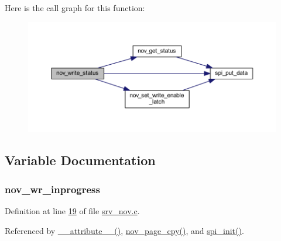 Here is the call graph for this function\+:
\nopagebreak
\begin{figure}[H]
\begin{center}
\leavevmode
\includegraphics[width=350pt]{d5/d16/a00029_a495e93d64734be469f6725de24dd44e1_cgraph}
\end{center}
\end{figure}




\subsection{Variable Documentation}
\hypertarget{a00029_a56fe014653ebdce270aeac664bf86e65}{
\subsubsection[{nov\+\_\+wr\+\_\+inprogress}]{ nov\+\_\+wr\+\_\+inprogress}}\label{a00029_a56fe014653ebdce270aeac664bf86e65}


Definition at line \hyperlink{a00060_source_l00019}{19} of file \hyperlink{a00060_source}{srv\+\_\+nov.\+c}.



Referenced by \hyperlink{a00041_source_l00025}{\+\_\+\+\_\+attribute\+\_\+\+\_\+()}, \hyperlink{a00060_source_l00663}{nov\+\_\+page\+\_\+cpy()}, and \hyperlink{a00032_source_l00030}{spi\+\_\+init()}.

